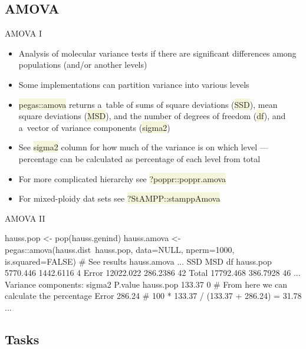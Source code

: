 \documentclass[compress, xelatex, 11pt, xcolor=svgnames, aspectratio=169,
	hyperref={
		bookmarks=true,
		unicode=true,
		colorlinks=true,
		pdftitle={Molecular data in R},
		plainpages=false,
		pdfauthor={Vojtech Zeisek},
		pdfsubject={Course about phylogeny and evolution in R},
		pdfcreator={XeLaTeX},
		pdfkeywords={R, evolution, phylogeny, molecular data},
		linkcolor=Crimson, %
		anchorcolor=Magenta, %
		citecolor=Magenta, %
		filecolor=Magenta, %
		menucolor=Magenta, %
		urlcolor=DodgerBlue, %
		},
	url={hyphens, lowtilde} %
	]{beamer}
\renewcommand{\texttt}[1]{\colorbox{Beige}{{\ttfamily #1}}}
\begin{document}
\subsection{AMOVA}

\begin{frame}{AMOVA I}
	\begin{itemize}
		\item Analysis of molecular variance tests if there are significant differences among populations (and/or another levels)
		\item Some implementations can partition variance into various levels
		\item \texttt{pegas::amova} returns a~table of sums of square deviations (\texttt{SSD}), mean square deviations (\texttt{MSD}), and the number of degrees of freedom (\texttt{df}), and a~vector of variance components (\texttt{sigma2})
		\item See \texttt{sigma2} column for how much of the variance is on which level --- percentage can be calculated as percentage of each level from total
		\item For more complicated hierarchy see \texttt{?poppr::poppr.amova}
		\item For mixed-ploidy dat sets see \texttt{?StAMPP::stamppAmova}
	\end{itemize}
\end{frame}

\begin{frame}[fragile]{AMOVA II}
	\begin{spluscode}
    hauss.pop <- pop(hauss.genind)
    hauss.amova <- pegas::amova(hauss.dist~hauss.pop, data=NULL,
      nperm=1000, is.squared=FALSE)
    # See results
    hauss.amova
    ...
                    SSD       MSD df
    hauss.pop  5770.446 1442.6116  4
    Error     12022.022  286.2386 42
    Total     17792.468  386.7928 46
    ...
    Variance components:
              sigma2 P.value
    hauss.pop 133.37       0 # From here we can calculate the percentage
    Error     286.24         # 100 * 133.37 / (133.37 + 286.24) = 31.78 %
    ...
	\end{spluscode}
\end{frame}

\subsection{Tasks}
\end{document}
